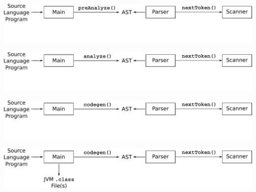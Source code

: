 \documentclass[8pt,a4paper,compress]{beamer}
\begin{document}
\begin{frame}[fragile]
\begin{center}
\begin{overprint}
\includegraphics[scale=0.45]{figures/organization6.pdf}

\includegraphics[scale=0.45]{figures/organization7.pdf}

\includegraphics[scale=0.45]{figures/organization8.pdf}

\includegraphics[scale=0.45]{figures/organization9.pdf}
\end{overprint}
\end{center}
\end{frame}
\end{document}
